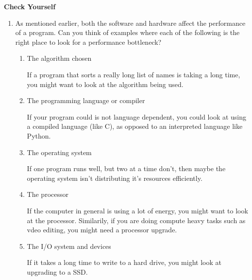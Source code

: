 \documentclass[10pt]{article}
\begin{document}
\textbf{Check Yourself}
\begin{enumerate}
\item As mentioned earlier, both the software and hardware affect the performance of a program. Can you think of examples where each of the following is the right place to look for a performance bottleneck?
\begin{enumerate}[label=\alph*)]
\item The algorithm chosen
  \begin{tcolorbox}[%
    enhanced, 
    breakable,
    frame hidden,
    overlay broken = {
      
      (frame.north west) rectangle (frame.south east);},
    ]
If a program that sorts a really long list of names is taking a long time, you might want to look at the algorithm being used.
\end{tcolorbox}
\item The programming language or compiler
  \begin{tcolorbox}[%
    enhanced, 
    breakable,
    frame hidden,
    overlay broken = {
      
      (frame.north west) rectangle (frame.south east);},
    ]
If your program could is not language dependent, you could look at using a compiled language (like C), as opposed to an interpreted language like Python.
\end{tcolorbox}
\item The operating system
  \begin{tcolorbox}[%
    enhanced, 
    breakable,
    frame hidden,
    overlay broken = {
      
      (frame.north west) rectangle (frame.south east);},
    ]
If one program runs well, but two at a time don't, then maybe the operating system isn't distributing it's resources efficiently.
\end{tcolorbox}
\item The processor
  \begin{tcolorbox}[%
    enhanced, 
    breakable,
    frame hidden,
    overlay broken = {
      
      (frame.north west) rectangle (frame.south east);},
    ]
If the computer in general is using a lot of energy, you might want to look at the processor. Similarily, if you are doing compute heavy tasks such as vdeo editing, you might need a processor upgrade.
\end{tcolorbox}

\item The I/O system and devices
  \begin{tcolorbox}[%
    enhanced, 
    breakable,
    frame hidden,
    overlay broken = {
      
      (frame.north west) rectangle (frame.south east);},
    ]
If it takes a long time to write to a hard drive, you might look at upgrading to a SSD.
  \end{tcolorbox}
\end{enumerate}
\end{enumerate}
\end{document}

